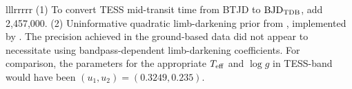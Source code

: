\begin{deluxetable*}{lllrrrrr}
{%
(1) To convert TESS mid-transit time from BTJD to ${\rm BJD}_{\rm TDB}$, add 2{,}457{,}000.
%
(2) Uninformative quadratic limb-darkening prior from \citet{exoplanet:kipping13}, implemented by \citet{exoplanet:exoplanet}.
The precision achieved in the ground-based data did not appear to
necessitate using bandpass-dependent limb-darkening coefficients.
For comparison, the \citet{claret_limb_2017} parameters for
the appropriate $T_{\rm eff}$ and $\log g$ in TESS-band would have been 
$(u_1, u_2) = (0.3249, 0.235)$.
%
}
\vspace{0cm}
\end{deluxetable*}
